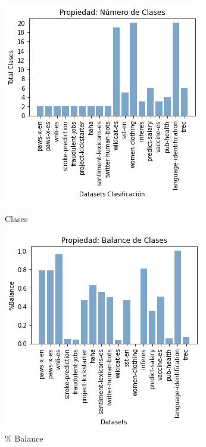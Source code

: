 \begin{figure}
  \centering
    \begin{minipage}[b]{0.31\textwidth}
        \centering
        \includegraphics[width=\textwidth]{Graphics/results/class.png}
          \caption{Clases}
          \label{fig:clases}
    \end{minipage}      
\hspace{0.03cm}
    \begin{minipage}[b]{0.31\textwidth}
        \centering
        \includegraphics[width=\textwidth]{Graphics/results/balance.png}
          \caption{\% Balance}
          \label{fig:balance}
        \end{minipage} 
      \end{figure}

